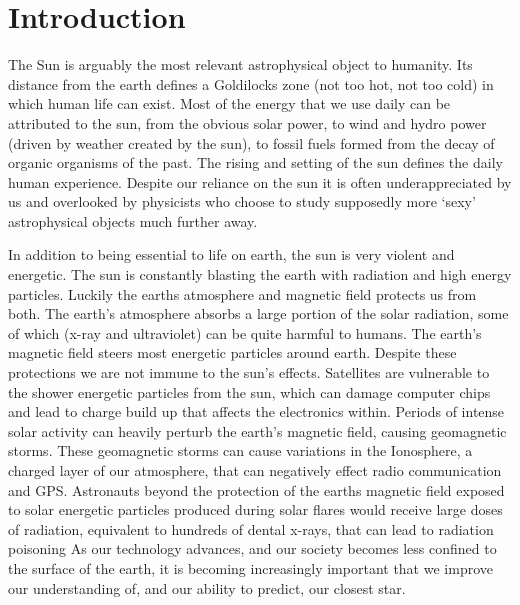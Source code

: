 \chapter{Introduction}\label{CH:introduction}


The Sun is arguably the most relevant astrophysical object to humanity.
Its distance from the earth defines a Goldilocks zone (not too hot, not too cold) in which human life can exist.
Most of the energy that we use daily can be attributed to the sun, from the obvious solar power, to wind and hydro power (driven by weather created by the sun), to fossil fuels formed from the decay of organic organisms of the past.
The rising and setting of the sun defines the daily human experience.
Despite our reliance on the sun it is often underappreciated by us and overlooked by physicists who choose to study supposedly more `sexy' astrophysical objects much further away.

In addition to being essential to life on earth, the sun is very violent and energetic.
The sun is constantly blasting the earth with radiation and high energy particles.
Luckily the earths atmosphere and magnetic field protects us from both.
The earth's atmosphere absorbs a large portion of the solar radiation, some of which (x-ray and ultraviolet) can be quite harmful to humans.
The earth's magnetic field steers most energetic particles around earth.
Despite these protections we are not immune to the sun's effects.
Satellites are vulnerable to the shower energetic particles from the sun, which can damage computer chips and lead to charge build up that affects the electronics within.
Periods of intense solar activity can heavily perturb the earth's magnetic field, causing geomagnetic storms.
These geomagnetic storms can cause variations in the Ionosphere, a charged layer of our atmosphere, that can negatively effect radio communication and GPS.
Astronauts beyond the protection of the earths magnetic field exposed to solar energetic particles produced during solar flares would receive large doses of radiation, equivalent to hundreds of dental x-rays, that can lead to radiation poisoning \citep[][and references therein]{Temmer2021}
As our technology advances, and our society becomes less confined to the surface of the earth, it is becoming increasingly important that we improve our understanding of, and our ability to predict, our closest star.

